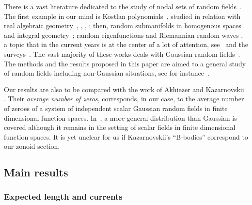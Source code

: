 \documentclass[10pt]{amsart}
\theoremstyle{definition}\newtheorem{defi}[theo]{Definition}\newtheorem{rema}[theo]{Remark}\newtheorem{exam}[theo]{Example}\newtheorem{exem}[theo]{Example}\newtheorem{nota}[theo]{Notation}
\begin{document}
There is a vast literature dedicated to the study of nodal sets of random fields~\cite{AdlerTaylor, AzaisWscheborbook, bogachev,marinucci_peccati_2011}. The first example in our mind is Kostlan polynomials~\cite{kostlan:93}, studied in relation with real algebraic geometry~\cite{shsm,ShSm1,ShSm3}, \cite{GaWe1,GaWe3,GaWe2}, \cite{NazarovSodin2009,NazarovSodin2016}, \cite{breiding2018geometry,basu2019random,FyLeLu,
kozhasov2020number,LeLu:gap,
Lerariolemniscate,stec2019MaxTyp}; then, random submanifolds in homogenous spaces and integral geometry~\cite{bernig2014integral,Brgisser2016ProbabilisticSC,
lerario2021probabilistic}; random eigenfunctions and Riemannian random waves \cite{Berry_1977,Zelditch2009RealAC}, a topic that in the current years is at the center of a lot of attention, see~\cite{CaHa2020,CammarotaM2015,CamMari2018Berry,Gass2020, Wig2013arith,WigYesha2021,MAFFUCCI2017,MaPeRoWi2015, MaRoWi2020Berry,MarRossVidotto2021,
MaWi2011defect, MaWi2011excarea, MaWi2014,  NourdinPeccatiRossi2019, WigRud2016, SarnakWigman2019, 
Wigman_2010}
and the surveys~\cite{canzani2019probabilistic, Ma2021surveyECS,WigSurvey2010,WigSurvey2022}. The vast majority of these works deals with Gaussian random fields~\cite{bogachev,dtgrf,Nicolaescu2016, NazarovSodin2016, NicSavale, MaxNotarnickHermite}. The methods and the results proposed in this paper are aimed to a general study of random fields including non-Gaussian situations, see for instance~\cite{KabluSartoWig2022,stecconi2021isotropic}.

Our results are also to be compared with the work of Akhiezer and Kazarnovskii \cite{KazaAveragezeroes}. Their \emph{average number of zeros}, corresponds, in our case, to the average number of zeroes of a system of independent scalar Gaussian random fields in finite dimensional function spaces. In~\cite{Kazarnovskii2020}, a more general distribution than Gaussian is covered although it remains in the setting of scalar fields in finite dimensional function spaces. It is yet unclear for us if Kazarnovskii's ``B-bodies'' correspond to our zonoid section.


\subsection{Main results}

\subsubsection{Expected length and currents}
\end{document}
